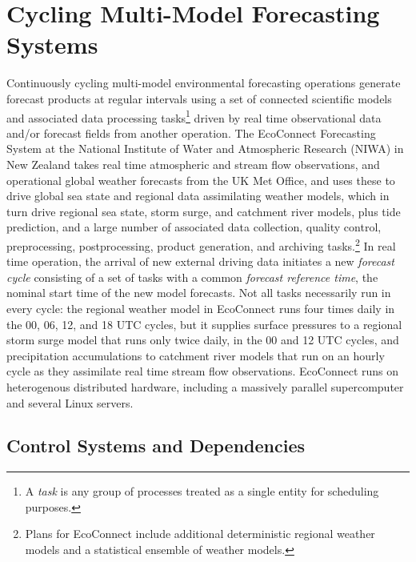 \documentclass[11pt,a4paper]{article}
\begin{document}
\section{Cycling Multi-Model Forecasting Systems}

Continuously cycling multi-model environmental forecasting operations
generate forecast products at regular intervals using a set of connected
scientific models and associated data processing tasks\footnote{A {\em
task} is any group of processes treated as a single entity for
scheduling purposes.} driven by real time observational data and/or
forecast fields from another operation. The EcoConnect Forecasting
System at the National Institute of Water and Atmospheric Research
(NIWA) in New Zealand takes real time atmospheric and stream flow
observations, and operational global weather forecasts from the UK Met
Office, and uses these to drive global sea state and regional data
assimilating weather models, which in turn drive regional sea state,
storm surge, and catchment river models, plus tide prediction, and a
large number of associated data collection, quality control,
preprocessing, postprocessing, product generation, and archiving
tasks.\footnote{Plans for EcoConnect include additional deterministic
regional weather models and a statistical ensemble of weather models.}
In real time operation, the arrival of new external driving data
initiates a new {\em forecast cycle} consisting of a set of tasks with a
common {\em forecast reference time}, the nominal start time of the new
model forecasts. Not all tasks necessarily run in every cycle: the
regional weather model in EcoConnect runs four times daily in the 00,
06, 12, and 18 UTC cycles, but it supplies surface pressures to a
regional storm surge model that runs only twice daily, in the 00 and 12
UTC cycles, and precipitation accumulations to catchment river models
that run on an hourly cycle as they assimilate real time stream flow
observations.  EcoConnect runs on heterogenous distributed hardware,
including a massively parallel supercomputer and several Linux servers. 

\subsection{Control Systems and Dependencies}
\end{document}
